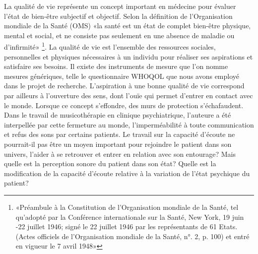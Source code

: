 La qualité de vie représente un concept important en médecine pour évaluer l'état de bien-être subjectif
et objectif. Selon la définition de l'Organisation mondiale de la Santé (OMS) «la santé est un état de 
complet bien-être physique, mental et social, et ne consiste pas seulement en une absence de maladie 
ou d’infirmité» \footnote{«Préambule à la Constitution de l'Organisation mondiale de la Santé, tel 
qu'adopté par la 
Conférence internationale sur la Santé, New York, 19 juin -22 juillet 1946; signé le 22 juillet 1946 par les 
représentants de 61 Etats. (Actes officiels de l'Organisation mondiale de la Santé, n°. 2, p. 100) et entré 
en vigueur le 7 avril 1948»}.
La  qualité de vie est 
l'ensemble 
des ressources sociales, 
personnelles et physiques nécessaires à un individu pour réaliser ses aspirations et satisfaire ses 
besoins. Il existe des instruments de mesure que l'on nomme mesures génériques, telle le 
questionnaire  WHOQOL 
que 
nous avons employé dans le projet de recherche.
L'aspiration à une bonne qualité de vie correspond par ailleurs  à l'ouverture des sens, dont l'ouïe qui 
permet d'entrer 
en contact avec le monde.
Lorsque ce concept s'effondre, des murs de protection s'échafaudent.
Dans le travail de musicothérapie en clinique psychiatrique, l'auteure a été interpellée par cette 
fermeture au monde, l'imperméabilité à 
 toute 
 communication et refus des sons par certains patients. Le travail sur la capacité d'écoute  ne 
 pourrait-il pas être un moyen important pour rejoindre le patient dans son univers, l'aider à se 
 retrouver et entrer en relation avec son entourage?  Mais quelle est la perception sonore du patient dans 
 son état?
   Quelle est la modification de la capacité d'écoute relative à la variation de l'état psychique du patient?
